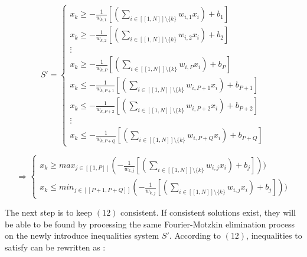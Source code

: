 \documentclass{article}
\begin{document}
\begin{appendices}
    
  
    \begin{equation}
        S'=
        \begin{cases}
            x_{k} \geqslant - \frac{1}{w_{k,1}}[(\sum_{i \in [\![1,N]\!] \setminus \lbrace{k}\rbrace}  w_{i,1}x_{i}) + b_{1}]
            \\  x_{k} \geqslant  - \frac{1}{w_{k,2}}[(\sum_{i \in [\![1,N]\!] \setminus \lbrace{k}\rbrace}  w_{i,2}x_{i}) + b_{2}]
            \\ \vdots 
            \\  x_{k} \geqslant - \frac{1}{w_{k,P}}[(\sum_{i \in [\![1,N]\!] \setminus \lbrace{k}\rbrace}  w_{i,P}x_{i}) + b_{P}]
            \\x_{k} \leqslant - \frac{1}{w_{k,P+1}}[(\sum_{i \in [\![1,N]\!] \setminus \lbrace{k}\rbrace}  w_{i,P+1}x_{i}) + b_{P+1}]
            \\  x_{k} \leqslant  - \frac{1}{w_{k,P+2}}[(\sum_{i \in [\![1,N]\!] \setminus \lbrace{k}\rbrace}  w_{i,P+2}x_{i}) + b_{P+2}]
            \\ \vdots 
            \\  x_{k} \leqslant - \frac{1}{w_{k,P+Q}}[(\sum_{i \in [\![1,N]\!] \setminus \lbrace{k}\rbrace}  w_{i,P+Q}x_{i}) + b_{P+Q}]
        \end{cases}
        \end{equation}

        \begin{equation*}
        \Rightarrow 
        \begin{cases}
         x_{k} \geqslant max_{j \in [\![1,P]\!]}(- \frac{1}{w_{k,j}}[(\sum_{i \in [\![1,N]\!] \setminus \lbrace{k}\rbrace}  w_{i,j}x_{i}) + b_{j}]))
        \\ x_{k} \leqslant min_{j \in [\![P+1,P+Q]\!]}(- \frac{1}{w_{k,j}}[(\sum_{i \in [\![1,N]\!] \setminus \lbrace{k}\rbrace}  w_{i,j}x_{i}) + b_{j}]))
        \end{cases} 
        \end{equation*}

        The next step is to keep $(12)$ consistent. If consistent solutions exist, they will be able to be found by processing the same Fourier-Motzkin 
        elimination process on the newly introduce inequalities system $S'$. According to $(12)$, inequalities to satisfy can be rewritten as :


\end{appendices}
\end{document}
